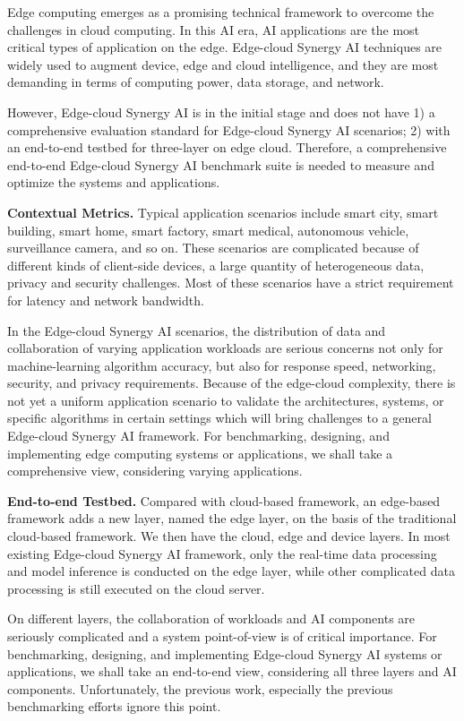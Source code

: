 Edge computing emerges as a promising technical framework to overcome the challenges in cloud computing. In this AI era, AI applications are the most critical types of application on the edge. Edge-cloud Synergy AI techniques are widely used to augment device, edge and cloud intelligence, and they are most demanding in terms of computing power, data storage, and network. 

However, Edge-cloud Synergy AI is in the initial stage and does not have 1) a comprehensive evaluation standard for Edge-cloud Synergy AI scenarios; 2) with an end-to-end testbed for three-layer on edge cloud. Therefore, a comprehensive end-to-end Edge-cloud Synergy AI benchmark suite is needed to measure and optimize the systems and applications.

\textbf{Contextual Metrics.} Typical application scenarios include smart city, smart building, smart home, smart factory, smart medical, autonomous vehicle, surveillance camera, and so on. These scenarios are complicated because of different kinds of client-side devices, a large quantity of heterogeneous data, privacy and security challenges. Most of these scenarios have a strict requirement for latency and network bandwidth. 

In the Edge-cloud Synergy AI scenarios, the distribution of data and collaboration of varying application workloads are serious concerns not only for machine-learning algorithm accuracy, but also for response speed, networking, security, and privacy requirements. Because of the edge-cloud complexity, there is not yet a uniform application scenario to validate the architectures, systems, or specific algorithms in certain settings which will bring challenges to a general Edge-cloud Synergy AI framework. For benchmarking, designing, and implementing edge computing systems or applications, we shall take a comprehensive view, considering varying applications. 

\textbf{End-to-end Testbed.} Compared with cloud-based framework, an edge-based framework adds a new layer, named the edge layer, on the basis of the traditional cloud-based framework. We then have the cloud, edge and device layers. In most existing Edge-cloud Synergy AI framework, only the real-time data processing and model inference is conducted on the edge layer, while other complicated data processing is still executed on the cloud server.

On different layers, the collaboration of workloads and AI components are seriously complicated and a system point-of-view is of critical importance. For benchmarking, designing, and implementing Edge-cloud Synergy AI systems or applications, we shall take an end-to-end view, considering all three layers and AI components. Unfortunately, the previous work, especially the previous benchmarking efforts ignore this point.

